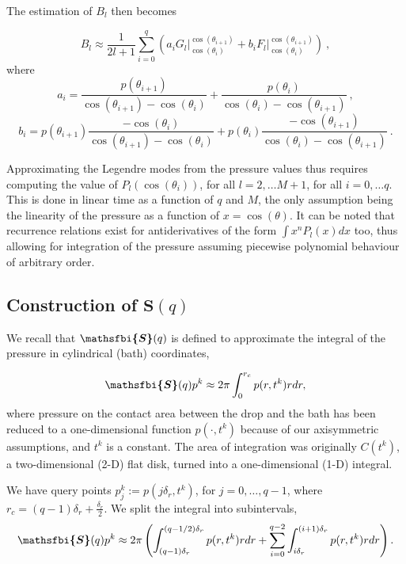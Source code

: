 \documentclass{jfm}
\newcommand{\bfjfm}[1]{\bm{\mathsfbi{#1}}}
\begin{document}
The estimation of $B_l$ then becomes

\begin{equation}
    B_l \approx \frac{1}{2l+1} \sum_{i=0}^{q} \left(a_i G_l\bigg|_{\cos(\theta_i)}^{\cos(\theta_{i+1})} + b_i  F_l\bigg|_{\cos(\theta_i)}^{\cos(\theta_{i+1})} \right) \ ,
\end{equation}
where
\begin{equation}
    a_i = \frac{p(\theta_{i+1}) }{\cos(\theta_{i+1}) - \cos(\theta_i)} + \frac{p(\theta_{i})}{\cos(\theta_{i}) - \cos(\theta_{i+1})} \ ,
\end{equation}
\begin{equation}
    b_i = p(\theta_{i+1})\frac{ - \cos(\theta_i)}{\cos(\theta_{i+1}) - \cos(\theta_i)} + p(\theta_{i})\frac{ - \cos(\theta_{i+1})}{\cos(\theta_{i}) - \cos(\theta_{i+1})} \ .
\end{equation}

Approximating the Legendre modes from the pressure values thus requires computing the value of $P_l(\cos(\theta_i))$, for all $ l = 2, \dots M+1$, for all $ i = 0, \dots q$. This is done in linear time as a function of $q$ and $M$, the only assumption being the linearity of the pressure as a function of $x = \cos(\theta)$. It can be noted that recurrence relations exist for antiderivatives of the form $\int x^n P_l(x) dx$ too, thus allowing for integration of the pressure assuming piecewise polynomial behaviour of arbitrary order.

\subsection{Construction of \(\mathbf{S}(q)\)}

We recall that $\bfjfm{S}(q)$ is defined  to approximate the integral of the pressure in cylindrical (bath) coordinates,

\begin{equation}
    \bfjfm{S}(q) p^{k} \approx 2\pi \int_0^{r_c}  p(r, t^k) r dr,
\end{equation}
where pressure on the contact area between the drop and the bath has been reduced to a one-dimensional function $p(\cdot, t^k)$ because of our axisymmetric assumptions, and $t^k$ is a constant. The area of integration was originally $C(t^k)$, a two-dimensional (2-D) flat disk, turned into a one-dimensional (1-D) integral. 

We have query points $p^k_j := p(j \delta_r, t^k)$, for $j = 0, \dots, q-1$, where $r_c = (q - 1)\delta_r + \frac{\delta_r}{2}$. We split the integral into subintervals,
\begin{equation}
    \bfjfm{S}(q) p^{k} \approx 2\pi \left( \int_{(q-1)\delta_r }^{(q-1/2)\delta_r}  p(r, t^k) r dr + \sum_{i=0}^{q-2}\int_{i \delta_r}^{(i+1)\delta_r}  p(r, t^k) r dr\right).
\end{equation}
\end{document}
